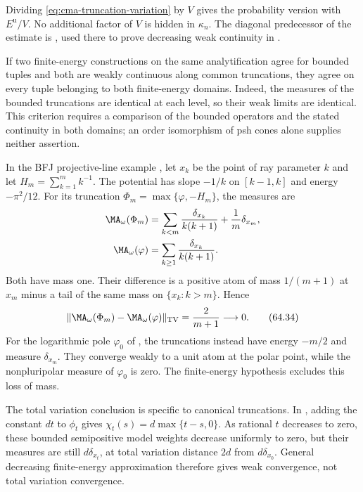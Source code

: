 Dividing \eqref{eq:cma-truncation-variation} by $V$ gives the probability version with $E^{\mathrm u}/V$. No additional factor of $V$ is hidden in $\kappa_n$. The diagonal predecessor of the estimate is \cite[Lemma~6.8]{BFJ15}, used there to prove decreasing weak continuity in \cite[Proposition~6.9]{BFJ15}.

If two finite-energy constructions on the same analytification agree for bounded tuples and both are weakly continuous along common truncations, they agree on every tuple belonging to both finite-energy domains. Indeed, the measures of the bounded truncations are identical at each level, so their weak limits are identical. This criterion requires a comparison of the bounded operators and the stated continuity in both domains; an order isomorphism of psh cones alone supplies neither assertion.

\begin{example}\label{ex:cma-truncation-mass-test}
In the BFJ projective-line example , let $x_k$ be the point of ray parameter $k$ and let $H_m=\sum_{k=1}^m k^{-1}$. The potential has slope $-1/k$ on $[k-1,k]$ and energy $-\pi^2/12$. For its truncation $\Phi_m=\max\{\varphi,-H_m\}$, the measures are
\[
 \begin{split}
 \MA_\omega(\Phi_m)
    &=\sum_{k<m}\frac{\delta_{x_k}}{k(k+1)}
                           +\frac1m\delta_{x_m},\\
 \MA_\omega(\varphi)
    &=\sum_{k\geq1}\frac{\delta_{x_k}}{k(k+1)}.
 \end{split}
\]
Both have mass one. Their difference is a positive atom of mass $1/(m+1)$ at $x_m$ minus a tail of the same mass on $\{x_k:k>m\}$. Hence
\[
 \|\MA_\omega(\Phi_m)-\MA_\omega(\varphi)\|_{\mathrm{TV}}
                          =\frac{2}{m+1}\longrightarrow0.
\tag{64.34}\label{eq:cma-harmonic-truncation-variation}
\]
For the logarithmic pole $\varphi_0$ of , the truncations instead have energy $-m/2$ and measure $\delta_{x_m}$. They converge weakly to a unit atom at the polar point, while the nonpluripolar measure of $\varphi_0$ is zero. The finite-energy hypothesis excludes this loss of mass.

The total variation conclusion is specific to canonical truncations. In , adding the constant $dt$ to $\phi_t$ gives $\chi_t(s)=d\max\{t-s,0\}$. As rational $t$ decreases to zero, these bounded semipositive model weights decrease uniformly to zero, but their measures are still $d\delta_{x_t}$, at total variation distance $2d$ from $d\delta_{x_0}$. General decreasing finite-energy approximation therefore gives weak convergence, not total variation convergence.
\end{example}

